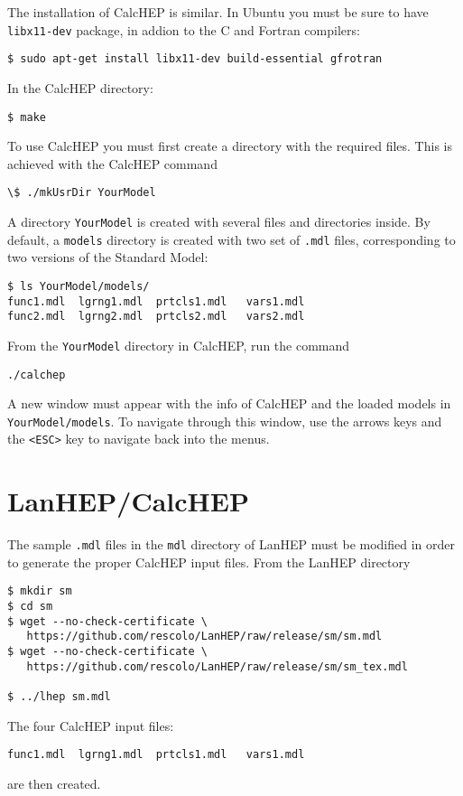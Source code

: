 \begin{frame}{}
The installation of CalcHEP is similar. In Ubuntu you must be sure to have \lstinline{libx11-dev} package, in addion to the C and Fortran compilers:
\begin{lstlisting}
$ sudo apt-get install libx11-dev build-essential gfrotran
\end{lstlisting}
In the CalcHEP directory:
\begin{lstlisting}
$ make
\end{lstlisting}

To use CalcHEP you must first create a directory with the required files. This is achieved with the CalcHEP command
\begin{lstlisting}
\$ ./mkUsrDir YourModel
\end{lstlisting}
A directory \lstinline{YourModel} is created with several files and directories inside. By default, a \lstinline{models} directory is created with two set of \lstinline{.mdl} files, corresponding to two versions of the Standard Model:
\begin{lstlisting}
$ ls YourModel/models/
func1.mdl  lgrng1.mdl  prtcls1.mdl   vars1.mdl  
func2.mdl  lgrng2.mdl  prtcls2.mdl   vars2.mdl
\end{lstlisting}

From the \lstinline{YourModel} directory in CalcHEP, run the command
\begin{lstlisting}
./calchep
\end{lstlisting}
A new window must appear with the info of CalcHEP and the loaded models in \lstinline{YourModel/models}. To navigate through this window, use the arrows keys and the \lstinline{<ESC>} key to navigate back into the menus.  

\section{LanHEP/CalcHEP}

The sample \lstinline{.mdl} files in the \lstinline{mdl} directory of LanHEP must be modified in order to generate the proper CalcHEP input files. From the LanHEP directory
\begin{lstlisting}
$ mkdir sm
$ cd sm
$ wget --no-check-certificate \
   https://github.com/rescolo/LanHEP/raw/release/sm/sm.mdl
$ wget --no-check-certificate \
   https://github.com/rescolo/LanHEP/raw/release/sm/sm_tex.mdl

$ ../lhep sm.mdl
\end{lstlisting}
The four CalcHEP input files:
\begin{lstlisting}
func1.mdl  lgrng1.mdl  prtcls1.mdl   vars1.mdl  
\end{lstlisting}
are then created.


\end{frame}
